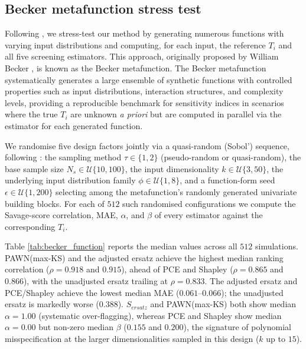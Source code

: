 \documentclass[12pt]{article}
\begin{document}
\subsection{Becker metafunction stress test}
\label{Becker}

Following \citet{puy2024discrepancy}, we stress-test our method by generating numerous functions with varying input distributions and computing, for each input, the reference $T_i$ and all five screening estimators. This approach, originally proposed by William Becker \citep{becker_metafunctions_2020, puy_comprehensive_2022}, is known as the Becker metafunction. The Becker metafunction systematically generates a large ensemble of synthetic functions with controlled properties such as input distributions, interaction structures, and complexity levels, providing a reproducible benchmark for sensitivity indices in scenarios where the true $T_i$ are unknown \emph{a priori} but are computed in parallel via the \citet{jansen1999} estimator for each generated function.

We randomise five design factors jointly via a quasi-random (Sobol') sequence, following \citet{puy2024discrepancy}: the sampling method $\tau\in\{1,2\}$ (pseudo-random or quasi-random), the base sample size $N_s \in \mathscr U\{10,100\}$, the input dimensionality $k \in \mathscr U\{3,50\}$, the underlying input distribution family $\phi \in \mathscr U\{1,8\}$, and a function-form seed $\epsilon \in \mathscr U\{1,200\}$ selecting among the metafunction's randomly generated univariate building blocks. For each of $512$ such randomised configurations we compute the Savage-score correlation, MAE, $\alpha$, and $\beta$ of every estimator against the corresponding $T_i$.

Table \ref{tab:becker_function} reports the median values across all $512$ simulations. PAWN(max-KS) and the adjusted ersatz achieve the highest median ranking correlation ($\rho=0.918$ and $0.915$), ahead of PCE and Shapley ($\rho=0.865$ and $0.866$), with the unadjusted ersatz trailing at $\rho=0.833$. The adjusted ersatz and PCE/Shapley achieve the lowest median MAE ($0.061$--$0.066$); the unadjusted ersatz is markedly worse ($0.388$). $S_{ersatz}$ and PAWN(max-KS) both show median $\alpha=1.00$ (systematic over-flagging), whereas PCE and Shapley show median $\alpha=0.00$ but non-zero median $\beta$ ($0.155$ and $0.200$), the signature of polynomial misspecification at the larger dimensionalities sampled in this design ($k$ up to $15$).
\end{document}
